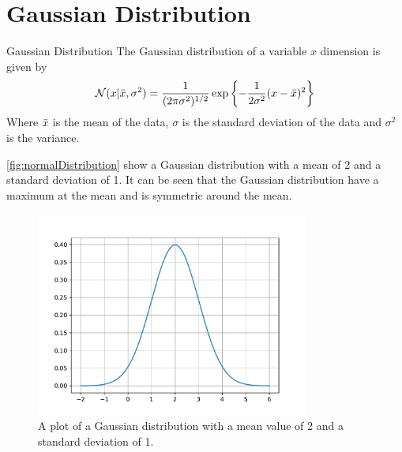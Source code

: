 \section{Gaussian Distribution}
\begin{definition}{Gaussian Distribution}
    The Gaussian distribution of a variable $x$ dimension is given by
    \begin{align*}
        \mathcal{N}(x|\Bar{x}, \sigma^2)=\frac{1}{(2\pi\sigma^2)^{1/2}}\exp\left\{-\frac{1}{2\sigma^2}(x-\Bar{x} )^2\right\}
    \end{align*}
    Where $\Bar{x}$ is the mean of the data, $\sigma$ is the standard deviation of the data and $\sigma^2$ is the variance. \cite[24]{patternmachineleaning}
\end{definition}
\autoref{fig:normalDistribution} show a Gaussian distribution with a mean of 2 and a standard deviation of 1. It can be seen that the Gaussian distribution have a maximum at the mean and is symmetric around the mean. 
\begin{figure}[H]
    \centering
    \includegraphics[width=0.8\textwidth]{figures/normalDistribution.pdf}
    \caption{A plot of a Gaussian distribution with a mean value of 2 and a standard deviation of 1.}
    \label{fig:normalDistribution}
\end{figure}
